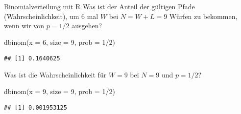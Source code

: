 \documentclass[
  ngerman,
  ignorenonframetext,
]{beamer}
\newenvironment{Shaded}{\begin{snugshade}}{\end{snugshade}}
\newcommand{\AttributeTok}[1]{\textcolor[rgb]{0.77,0.63,0.00}{#1}}
\newcommand{\DecValTok}[1]{\textcolor[rgb]{0.00,0.00,0.81}{#1}}
\newcommand{\FunctionTok}[1]{\textcolor[rgb]{0.00,0.00,0.00}{#1}}
\newcommand{\NormalTok}[1]{#1}
\newcommand{\SpecialCharTok}[1]{\textcolor[rgb]{0.00,0.00,0.00}{#1}}
\begin{document}
\begin{frame}[fragile]{Binomialverteilung mit R}
\protect\hypertarget{binomialverteilung-mit-r}{}
Was ist der Anteil der gültigen Pfade (Wahrscheinlichkeit), um 6 mal
\(W\) bei \(N=W+L=9\) Würfen zu bekommen, wenn wir von \(p=1/2\)
ausgehen?

\begin{Shaded}
\begin{Highlighting}[]
\FunctionTok{dbinom}\NormalTok{(}\AttributeTok{x =} \DecValTok{6}\NormalTok{, }\AttributeTok{size =} \DecValTok{9}\NormalTok{, }\AttributeTok{prob =} \DecValTok{1}\SpecialCharTok{/}\DecValTok{2}\NormalTok{)}
\end{Highlighting}
\end{Shaded}

\begin{verbatim}
## [1] 0.1640625
\end{verbatim}

Was ist die Wahrscheinlichkeit für \(W=9\) bei \(N=9\) und \(p=1/2\)?

\begin{Shaded}
\begin{Highlighting}[]
\FunctionTok{dbinom}\NormalTok{(}\AttributeTok{x =} \DecValTok{9}\NormalTok{, }\AttributeTok{size =} \DecValTok{9}\NormalTok{, }\AttributeTok{prob =} \DecValTok{1}\SpecialCharTok{/}\DecValTok{2}\NormalTok{)}
\end{Highlighting}
\end{Shaded}

\begin{verbatim}
## [1] 0.001953125
\end{verbatim}
\end{frame}
\end{document}
